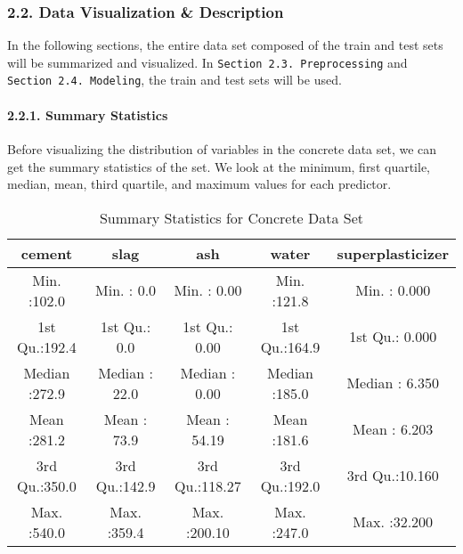 \documentclass[
]{article}
\begin{document}
\hypertarget{data-visualization-description}{%
\subsubsection{2.2. Data Visualization \&
Description}\label{data-visualization-description}}

In the following sections, the entire data set composed of the train and
test sets will be summarized and visualized. In
\texttt{Section\ 2.3.\ Preprocessing} and
\texttt{Section\ 2.4.\ Modeling}, the train and test sets will be used.

\hypertarget{summary-statistics}{%
\paragraph{2.2.1. Summary Statistics}\label{summary-statistics}}

\hfill\break
Before visualizing the distribution of variables in the concrete data
set, we can get the summary statistics of the set. We look at the
minimum, first quartile, median, mean, third quartile, and maximum
values for each predictor.

\begin{table}[H]

\caption{\label{tab:Table 1 - Summary Statistics for data set}Summary Statistics for Concrete Data Set}
\centering
\fontsize{11}{13}\selectfont
\begin{tabular}[t]{|>{}c|||>{}c|||>{}c|||>{}c|||>{}c|}
\hline
    cement &      slag &      ash &     water & superplasticizer\\
\hline
Min.   :102.0 & Min.   :  0.0 & Min.   :  0.00 & Min.   :121.8 & Min.   : 0.000\\
\hline
1st Qu.:192.4 & 1st Qu.:  0.0 & 1st Qu.:  0.00 & 1st Qu.:164.9 & 1st Qu.: 0.000\\
\hline
Median :272.9 & Median : 22.0 & Median :  0.00 & Median :185.0 & Median : 6.350\\
\hline
Mean   :281.2 & Mean   : 73.9 & Mean   : 54.19 & Mean   :181.6 & Mean   : 6.203\\
\hline
3rd Qu.:350.0 & 3rd Qu.:142.9 & 3rd Qu.:118.27 & 3rd Qu.:192.0 & 3rd Qu.:10.160\\
\hline
Max.   :540.0 & Max.   :359.4 & Max.   :200.10 & Max.   :247.0 & Max.   :32.200\\
\hline
\end{tabular}
\end{table}
\end{document}
